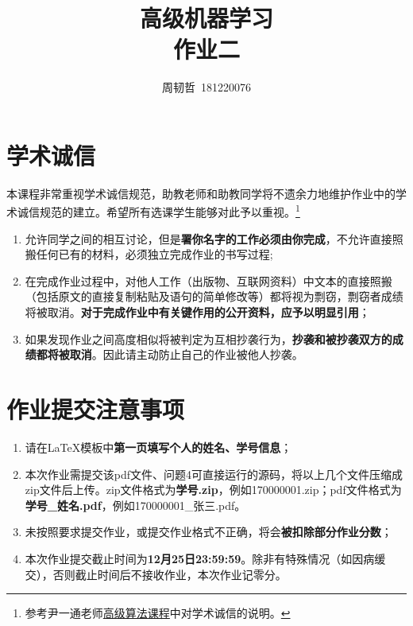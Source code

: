 \documentclass[a4paper,UTF8]{article}
\numberwithin{equation}{section}
\begin{document}
\title{高级机器学习\\
作业二}
\author{周韧哲\, 181220076} 
\maketitle

\section*{学术诚信}

本课程非常重视学术诚信规范，助教老师和助教同学将不遗余力地维护作业中的学术诚信规范的建立。希望所有选课学生能够对此予以重视。\footnote{参考尹一通老师\href{http://tcs.nju.edu.cn/wiki/}{高级算法课程}中对学术诚信的说明。}

\begin{tcolorbox}
	\begin{enumerate}
		\item[(1)] 允许同学之间的相互讨论，但是{\color{red}\textbf{署你名字的工作必须由你完成}}，不允许直接照搬任何已有的材料，必须独立完成作业的书写过程;
		\item[(2)] 在完成作业过程中，对他人工作（出版物、互联网资料）中文本的直接照搬（包括原文的直接复制粘贴及语句的简单修改等）都将视为剽窃，剽窃者成绩将被取消。{\color{red}\textbf{对于完成作业中有关键作用的公开资料，应予以明显引用}}；
		\item[(3)] 如果发现作业之间高度相似将被判定为互相抄袭行为，{\color{red}\textbf{抄袭和被抄袭双方的成绩都将被取消}}。因此请主动防止自己的作业被他人抄袭。
	\end{enumerate}
\end{tcolorbox}

\section*{作业提交注意事项}
\begin{tcolorbox}
	\begin{enumerate}
		\item[(1)] 请在LaTeX模板中{\color{red}\textbf{第一页填写个人的姓名、学号信息}}；
		\item[(2)] 本次作业需提交该pdf文件、问题4可直接运行的源码，将以上几个文件压缩成zip文件后上传。zip文件格式为{\color{red}\textbf{学号.zip}}，例如170000001.zip；pdf文件格式为{\color{red}\textbf{学号\_姓名.pdf}}，例如170000001\_张三.pdf。
		\item[(3)] 未按照要求提交作业，或提交作业格式不正确，将会{\color{red}\textbf{被扣除部分作业分数}}；
		\item[(4)] 本次作业提交截止时间为{\color{red}\textbf{12月25日23:59:59}}。除非有特殊情况（如因病缓交），否则截止时间后不接收作业，本次作业记零分。
	\end{enumerate}
\end{tcolorbox}
\end{document}
